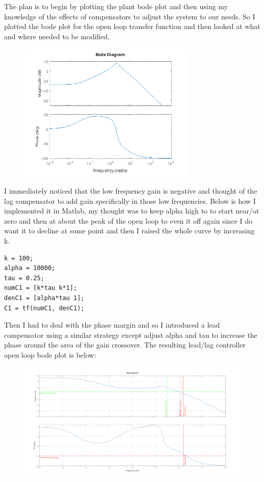 \documentclass{article}
\begin{document}
The plan is to begin by plotting the plant bode plot and then using my knowledge of the effects of compensators to adjust the system to our needs.
So I plotted the bode plot for the open loop transfer function and then looked at what and where needed to be modified.

\begin{figure}[H]
    \centering
    \includegraphics[width=0.75\textwidth]{delta4openPlot.png}
\end{figure}

I immediately noticed that the low frequency gain is negative and thought of the lag compensator to add gain specifically in those low frequencies.
Below is how I implemented it in Matlab, my thought was to keep alpha high to to start near/at zero and then at about the peak of the open loop to even it off again since I do want it to decline at some point and then I raised the whole curve by increasing k.

\begin{lstlisting}[style=matlabstyle]
k = 100;
alpha = 10000;
tau = 0.25;
numC1 = [k*tau k*1];
denC1 = [alpha*tau 1];
C1 = tf(numC1, denC1);    
\end{lstlisting}

Then I had to deal with the phase margin and so I introduced a lead compensator using a similar strategy except adjust alpha and tau to increase the phase around the area of the gain crossover.
The resulting lead/lag controller open loop bode plot is below:

\begin{figure}[H]
    \centering
    \includegraphics[width=\textwidth]{delta4leadLagPlot.png}
\end{figure}
\end{document}
